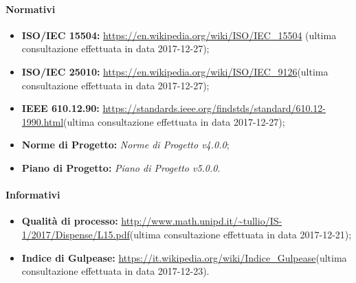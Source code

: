 		\paragraph{Normativi}
			\begin{itemize}
				\item \textbf{ISO/IEC 15504:} \url{https://en.wikipedia.org/wiki/ISO/IEC\_15504} (ultima consultazione effettuata in data 2017-12-27);
				\item \textbf{ISO/IEC 25010:} \url{https://en.wikipedia.org/wiki/ISO/IEC\_9126}(ultima consultazione effettuata in data 2017-12-27);
				\item \textbf{IEEE 610.12.90:} \url{https://standards.ieee.org/findstds/standard/610.12-1990.html}(ultima consultazione effettuata in data 2017-12-27);
				\item \textbf{Norme di Progetto:} \emph{Norme di Progetto v4.0.0};
				\item \textbf{Piano di Progetto:} \emph{Piano di Progetto v5.0.0}.
			\end{itemize}

		\paragraph{Informativi} 
			\begin{itemize}
				\item \textbf{Qualità di processo:} \url{http://www.math.unipd.it/~tullio/IS-1/2017/Dispense/L15.pdf}(ultima consultazione effettuata in data 2017-12-21);
				\item \textbf{Indice di Gulpease:} \url{https://it.wikipedia.org/wiki/Indice\_Gulpease}(ultima consultazione effettuata in data 2017-12-23).
			\end{itemize}